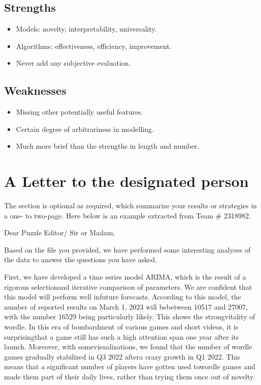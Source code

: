 \documentclass[12pt]{article}  %
\begin{document}
 \subsection{Strengths}
 
 \begin{itemize}
     \setlength{\parsep}{0ex} %
     \setlength{\topsep}{2ex} %
     \setlength{\itemsep}{1ex} %
     \item Models: novelty, interpretability,  universality.
     \item Algorithms: effectiveness, efficiency, improvement.	
     \item Never add any subjective evaluation.
 \end{itemize}
 
 \subsection{Weaknesses}
 
 \begin{itemize}
     \setlength{\parsep}{0ex} %
     \setlength{\topsep}{2ex} %
     \setlength{\itemsep}{1ex} %
     \item Missing other potentially useful features. 
     \item Certain degree of arbitrariness in modelling.	
     \item Much more brief than the strengths in length and number.
 \end{itemize}
 
 
 
 \clearpage
 \section{A Letter to the designated person}
 
 The section is optional as required, which summarize your results or strategies in a one- to two-page. Here below is an example extracted from Team \# 2318982.
 
 \noindent Dear Puzzle Editor/ Sir or Madam, 
 
 \noindent Based on the file you provided, we have performed some interesting analyses of the data to answer the questions you have asked.
 
 \noindent First, we have developed a time series model ARIMA, which is the result of a rigorous selectionand iterative comparison of parameters. We are confident that this model will perform well infuture forecasts. According to this model, the number of reported results on March 1, 2023 will bebetween 10517 and 27007, with the number 16529 being particularly likely. This shows the strongvitality of wordle. In this era of bombardment of various games and short videos, it is surprisingthat a game still has such a high attention span one year after its launch. Moreover, with somevisualizations, we found that the number of wordle games gradually stabilized in Q3 2022 aftera crazy growth in Q1 2022. This means that a significant number of players have gotten used towordle games and made them part of their daily lives, rather than trying them once out of novelty.
 
\end{document}
